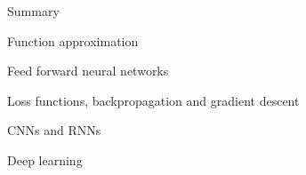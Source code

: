 \begin{frame}{Summary}

    \blist
        \item Function approximation 
        \item Feed forward neural networks
        \item Loss functions, backpropagation and gradient descent
        \item CNNs and RNNs
    \elist


    \blist
        \item Deep  learning 
    \elist
    
    
\end{frame}



